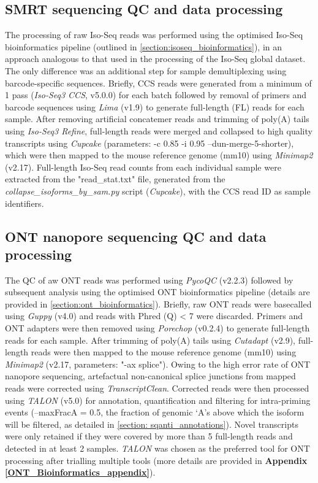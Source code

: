 \newpage
\subsection{SMRT sequencing QC and data processing}
The processing of raw Iso-Seq reads was performed using the optimised Iso-Seq bioinformatics pipeline (outlined in \cref{section:isoseq_bioinformatics}), in an approach analogous to that used in the processing of the Iso-Seq global dataset. The only difference was an additional step for sample demultiplexing using barcode-specific sequences. Briefly, CCS reads were generated from a minimum of 1 pass (\textit{Iso-Seq3 CCS}, v5.0.0) for each batch followed by removal of primers and barcode sequences using \textit{Lima} (v1.9) to generate full-length (FL) reads for each sample. After removing artificial concatemer reads and trimming of poly(A) tails using \textit{Iso-Seq3 Refine}, full-length reads were merged and collapsed to high quality transcripts using \textit{Cupcake} (parameters: -c 0.85 -i 0.95 --dun-merge-5-shorter), which were then mapped to the mouse reference genome (mm10) using \textit{Minimap2} (v2.17). Full-length Iso-Seq read counts from each individual sample were extracted from the "read\_stat.txt" file, generated from the \textit{collapse\_isoforms\_by\_sam.py} script (\textit{Cupcake}), with the CCS read ID as sample identifiers.

\subsection{ONT nanopore sequencing QC and data processing}
The QC of aw ONT reads was performed using \textit{PycoQC}\cite{Leger2019} (v2.2.3) followed by subsequent analysis using the optimised ONT bioinformatics pipeline (details are provided in \cref{section:ont_bioinformatics}). Briefly, raw ONT reads were basecalled using \textit{Guppy} (v4.0) and reads with Phred (Q) < 7 were discarded. Primers and ONT adapters were then removed using \textit{Porechop} (v0.2.4) to generate full-length reads for each sample. After trimming of poly(A) tails using \textit{Cutadapt} (v2.9), full-length reads were then mapped to the mouse reference genome (mm10) using \textit{Minimap2} (v2.17, parameters: "-ax splice"). Owing to the high error rate of ONT nanopore sequencing, artefactual non-canonical splice junctions from mapped reads were corrected using \textit{TranscriptClean}\cite{Wyman2019b}. Corrected reads were then processed using \textit{TALON}\cite{Wyman2019} (v5.0) for annotation, quantification and filtering for intra-priming events (--maxFracA = 0.5, the fraction of genomic ‘A's above which the isoform will be filtered, as detailed in \cref{section: sqanti_annotations}). Novel transcripts were only retained if they were covered by more than 5 full-length reads and detected in at least 2 samples. \textit{TALON} was chosen as the preferred tool for ONT processing after trialling multiple tools (more details are provided in \textbf{Appendix} \textbf{\ref{ONT_Bioinformatics_appendix}}). 

